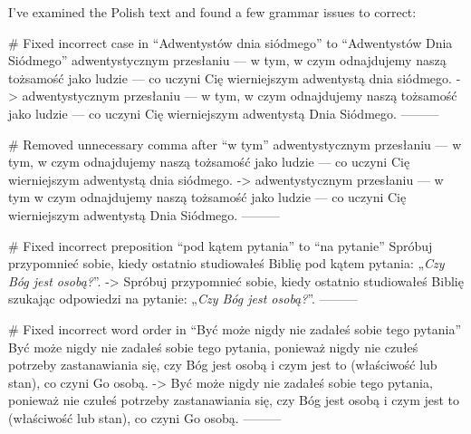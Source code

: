 I've examined the Polish text and found a few grammar issues to correct:

# Fixed incorrect case in “Adwentystów dnia siódmego” to “Adwentystów Dnia Siódmego”
adwentystycznym przesłaniu — w tym, w czym odnajdujemy naszą tożsamość jako ludzie — co uczyni Cię wierniejszym adwentystą dnia siódmego.
->
adwentystycznym przesłaniu — w tym, w czym odnajdujemy naszą tożsamość jako ludzie — co uczyni Cię wierniejszym adwentystą Dnia Siódmego.
---------

# Removed unnecessary comma after “w tym”
adwentystycznym przesłaniu — w tym, w czym odnajdujemy naszą tożsamość jako ludzie — co uczyni Cię wierniejszym adwentystą dnia siódmego.
->
adwentystycznym przesłaniu — w tym w czym odnajdujemy naszą tożsamość jako ludzie — co uczyni Cię wierniejszym adwentystą Dnia Siódmego.
---------

# Fixed incorrect preposition “pod kątem pytania” to “na pytanie”
Spróbuj przypomnieć sobie, kiedy ostatnio studiowałeś Biblię pod kątem pytania: „\textit{Czy Bóg jest osobą?}”.
->
Spróbuj przypomnieć sobie, kiedy ostatnio studiowałeś Biblię szukając odpowiedzi na pytanie: „\textit{Czy Bóg jest osobą?}”.
---------

# Fixed incorrect word order in “Być może nigdy nie zadałeś sobie tego pytania”
Być może nigdy nie zadałeś sobie tego pytania, ponieważ nigdy nie czułeś potrzeby zastanawiania się, czy Bóg jest osobą i czym jest to (właściwość lub stan), co czyni Go osobą.
->
Być może nigdy nie zadałeś sobie tego pytania, ponieważ nie czułeś potrzeby zastanawiania się, czy Bóg jest osobą i czym jest to (właściwość lub stan), co czyni Go osobą.
---------